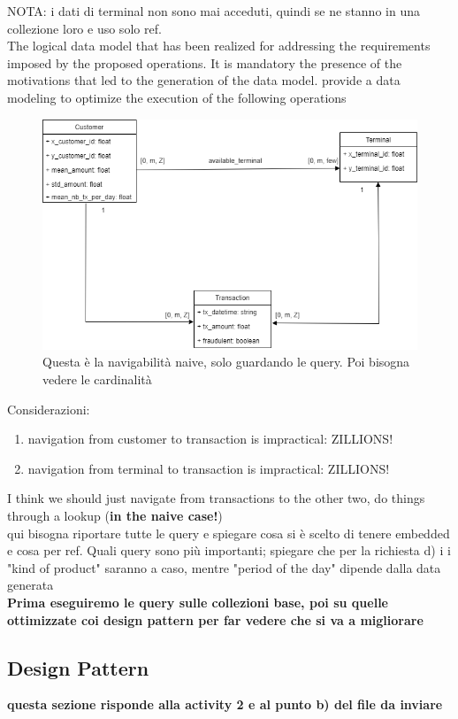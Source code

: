 \documentclass[letterpaper,11pt]{article}
\begin{document}
NOTA: i dati di terminal non sono mai acceduti, quindi se ne stanno in una collezione loro e uso solo ref.
\\
The logical data model that has been realized for addressing the requirements imposed by the proposed operations. It is mandatory the presence of the motivations that led to the generation of the data model.
provide a data modeling to optimize the execution of the following operations
\begin{figure}[ht] 
        \centering \includegraphics[width=0.9\columnwidth]{images/MongoNaiveNavigability.png}
        \caption{\label{fig1}Questa è la navigabilità naive, solo guardando le query. Poi bisogna vedere le cardinalità}
\end{figure}
Considerazioni:
\begin{enumerate}
    \item navigation from customer to transaction is impractical: ZILLIONS!
    \item navigation from terminal to transaction is impractical: ZILLIONS!
\end{enumerate}
I think we should just navigate from transactions to the other two, do things through a lookup (\textbf{in the naive case!})
\\
qui bisogna riportare tutte le query e spiegare cosa si è scelto di tenere embedded e cosa per ref. Quali query sono più importanti; spiegare che per la richiesta d) i i "kind of product" saranno a caso, mentre "period of the day" dipende dalla data generata
\\
\textbf{Prima eseguiremo le query sulle collezioni base, poi su quelle ottimizzate coi design pattern per far vedere che si va a migliorare}
\subsection{Design Pattern}
\textbf{questa sezione risponde alla activity 2 e al punto b) del file da inviare}
\end{document}
